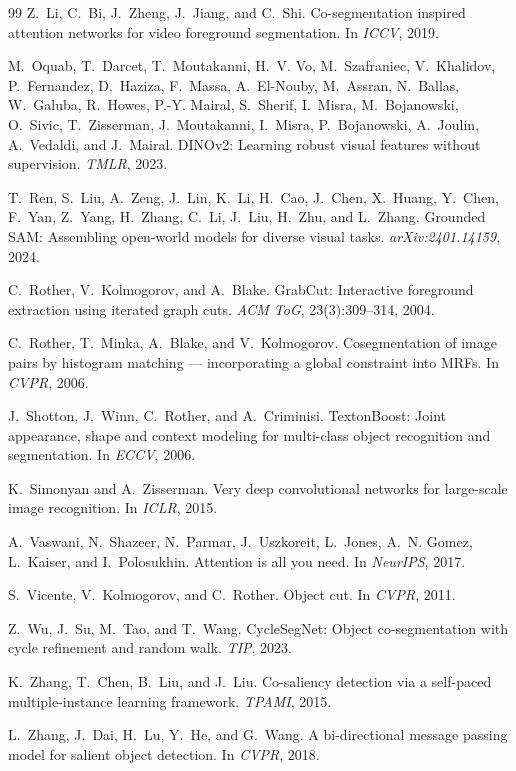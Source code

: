 \documentclass[10pt,twocolumn,letterpaper]{article}
\begin{document}
\begin{thebibliography}{99}
Z.~Li, C.~Bi, J.~Zheng, J.~Jiang, and C.~Shi.
\newblock Co-segmentation inspired attention networks for video foreground
segmentation.
\newblock In \emph{ICCV}, 2019.

M.~Oquab, T.~Darcet, T.~Moutakanni, H.~V. Vo, M.~Szafraniec, V.~Khalidov,
P.~Fernandez, D.~Haziza, F.~Massa, A.~El-Nouby, M.~Assran, N.~Ballas,
W.~Galuba, R.~Howes, P.-Y. Mairal, S.~Sherif, I.~Misra, M.~Bojanowski,
O.~Sivic, T.~Zisserman, J.~Moutakanni, I.~Misra, P.~Bojanowski, A.~Joulin,
A.~Vedaldi, and J.~Mairal.
\newblock DINOv2: Learning robust visual features without supervision.
\newblock \emph{TMLR}, 2023.

T.~Ren, S.~Liu, A.~Zeng, J.~Lin, K.~Li, H.~Cao, J.~Chen, X.~Huang, Y.~Chen,
F.~Yan, Z.~Yang, H.~Zhang, C.~Li, J.~Liu, H.~Zhu, and L.~Zhang.
\newblock Grounded SAM: Assembling open-world models for diverse visual tasks.
\newblock \emph{arXiv:2401.14159}, 2024.

C.~Rother, V.~Kolmogorov, and A.~Blake.
\newblock GrabCut: Interactive foreground extraction using iterated graph cuts.
\newblock \emph{ACM ToG}, 23(3):309--314, 2004.

C.~Rother, T.~Minka, A.~Blake, and V.~Kolmogorov.
\newblock Cosegmentation of image pairs by histogram matching — incorporating
a global constraint into MRFs.
\newblock In \emph{CVPR}, 2006.

J.~Shotton, J.~Winn, C.~Rother, and A.~Criminisi.
\newblock TextonBoost: Joint appearance, shape and context modeling for
multi-class object recognition and segmentation.
\newblock In \emph{ECCV}, 2006.

K.~Simonyan and A.~Zisserman.
\newblock Very deep convolutional networks for large-scale image recognition.
\newblock In \emph{ICLR}, 2015.

A.~Vaswani, N.~Shazeer, N.~Parmar, J.~Uszkoreit, L.~Jones, A.~N. Gomez,
L.~Kaiser, and I.~Polosukhin.
\newblock Attention is all you need.
\newblock In \emph{NeurIPS}, 2017.

S.~Vicente, V.~Kolmogorov, and C.~Rother.
\newblock Object cut.
\newblock In \emph{CVPR}, 2011.

Z.~Wu, J.~Su, M.~Tao, and T.~Wang.
\newblock CycleSegNet: Object co-segmentation with cycle refinement and
random walk.
\newblock \emph{TIP}, 2023.

K.~Zhang, T.~Chen, B.~Liu, and J.~Liu.
\newblock Co-saliency detection via a self-paced multiple-instance learning
framework.
\newblock \emph{TPAMI}, 2015.

L.~Zhang, J.~Dai, H.~Lu, Y.~He, and G.~Wang.
\newblock A bi-directional message passing model for salient object detection.
\newblock In \emph{CVPR}, 2018.

\end{thebibliography}
\endgroup
\end{document}
